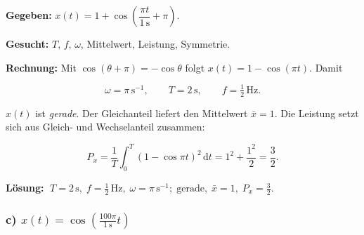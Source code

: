 \begin{beispiel}

\textbf{Gegeben:} $x(t) = 1 + \cos\!\left(\dfrac{\pi t}{1\,\mathrm{s}} + \pi\right)$.

\textbf{Gesucht:} $T,\, f,\, \omega$, Mittelwert, Leistung, Symmetrie.

\textbf{Rechnung:} Mit $\cos(\theta + \pi) = -\cos\theta$ folgt
$x(t) = 1 - \cos(\pi t)$. Damit

$$
\omega = \pi\,\mathrm{s}^{-1}, \qquad T = 2\,\mathrm{s}, \qquad
f = \tfrac12\,\mathrm{Hz}.
$$

$x(t)$ ist \emph{gerade}. Der Gleichanteil liefert den Mittelwert
$\bar{x} = 1$. Die Leistung setzt sich aus Gleich- und Wechselanteil zusammen:

$$
P_x = \frac{1}{T}\int_0^T (1 - \cos\pi t)^2\,\mathrm{d}t
    = 1^2 + \frac{1^2}{2} = \frac{3}{2}.
$$

\begin{center}
\end{center}

\textbf{Lösung:}
$\boxed{\;T = 2\,\mathrm{s},\; f = \tfrac12\,\mathrm{Hz},\;
\omega = \pi\,\mathrm{s}^{-1};\; \text{gerade},\;
\bar{x} = 1,\; P_x = \tfrac32.\;}$

\end{beispiel}

\subsubsection*{c) $x(t) = \cos\!\left(\frac{100\pi}{1\,\mathrm{s}}t\right)$}

